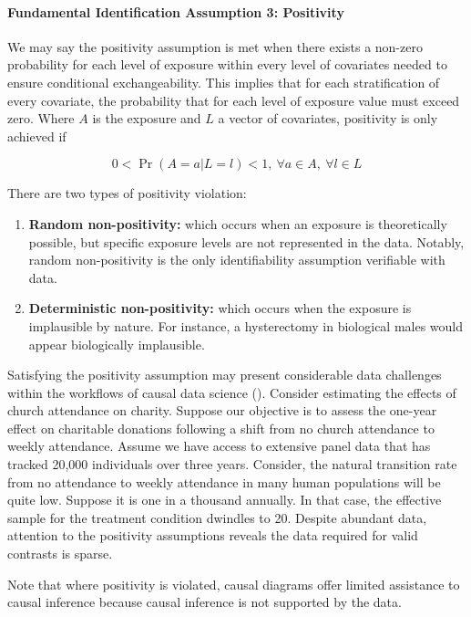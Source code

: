 \documentclass[
  singlecolumn,
  9pt]{article}
\let\oldparagraph\paragraph
\renewcommand{\paragraph}[1]{\oldparagraph{#1}\mbox{}}
\begin{document}
\paragraph{Fundamental Identification Assumption 3:
Positivity}\label{fundamental-identification-assumption-3-positivity}

We may say the positivity assumption is met when there exists a non-zero
probability for each level of exposure within every level of covariates
needed to ensure conditional exchangeability. This implies that for each
stratification of every covariate, the probability that for each level
of exposure value must exceed zero. Where \(A\) is the exposure and
\(L\) a vector of covariates, positivity is only achieved if

\[
0 < \Pr(A = a | L = l) < 1, ~ \forall a \in A, ~ \forall l \in L
\]

There are two types of positivity violation:

\begin{enumerate}
\def\labelenumi{\arabic{enumi}.}
\item
  \textbf{Random non-positivity:} which occurs when an exposure is
  theoretically possible, but specific exposure levels are not
  represented in the data. Notably, random non-positivity is the only
  identifiability assumption verifiable with data.
\item
  \textbf{Deterministic non-positivity:} which occurs when the exposure
  is implausible by nature. For instance, a hysterectomy in biological
  males would appear biologically implausible.
\end{enumerate}

Satisfying the positivity assumption may present considerable data
challenges within the workflows of causal data science
(). Consider
estimating the effects of church attendance on charity. Suppose our
objective is to assess the one-year effect on charitable donations
following a shift from no church attendance to weekly attendance. Assume
we have access to extensive panel data that has tracked 20,000
individuals over three years. Consider, the natural transition rate from
no attendance to weekly attendance in many human populations will be
quite low. Suppose it is one in a thousand annually. In that case, the
effective sample for the treatment condition dwindles to 20. Despite
abundant data, attention to the positivity assumptions reveals the data
required for valid contrasts is sparse.

Note that where positivity is violated, causal diagrams offer limited
assistance to causal inference because causal inference is not supported
by the data.
\end{document}
